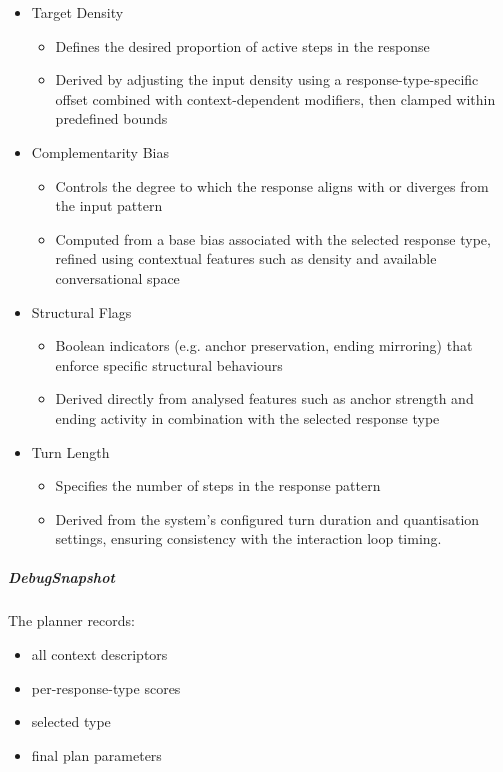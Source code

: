 \begin{itemize}
\item
  Target Density

  \begin{itemize}
  \item
    Defines the desired proportion of active steps in the response
  \item
    Derived by adjusting the input density using a
    response-type-specific offset combined with context-dependent
    modifiers, then clamped within predefined bounds
  \end{itemize}
\item
  Complementarity Bias

  \begin{itemize}
  \item
    Controls the degree to which the response aligns with or diverges
    from the input pattern
  \item
    Computed from a base bias associated with the selected response
    type, refined using contextual features such as density and
    available conversational space
  \end{itemize}
\item
  Structural Flags

  \begin{itemize}
  \item
    Boolean indicators (e.g. anchor preservation, ending mirroring) that
    enforce specific structural behaviours
  \item
    Derived directly from analysed features such as anchor strength and
    ending activity in combination with the selected response type
  \end{itemize}
\item
  Turn Length

  \begin{itemize}
  \item
    Specifies the number of steps in the response pattern
  \item
    Derived from the system's configured turn duration and quantisation
    settings, ensuring consistency with the interaction loop timing.
  \end{itemize}
\end{itemize}

\subparagraph{DebugSnapshot}\label{debugsnapshot}

The planner records:

\begin{itemize}
\item
  all context descriptors
\item
  per-response-type scores
\item
  selected type
\item
  final plan parameters
\end{itemize}

